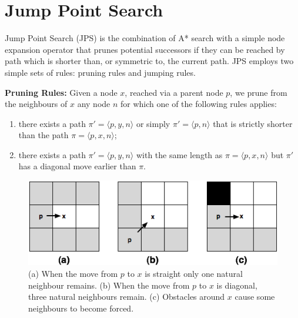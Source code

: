 \section{Jump Point Search}
\label{sec::jps}
Jump Point Search (JPS) is the combination of A* search with a simple
node expansion operator that prunes potential successors if
they can be reached by path which is shorter than, or symmetric to,
the current path. JPS employs two simple sets of rules:
pruning rules and jumping rules. 

\textbf{Pruning Rules:}
Given a node $x$, reached via a parent node $p$,
we prune from the neighbours of $x$ any node $n$ for which one 
of the following rules applies:
\begin{enumerate}
\item 
  there exists a path $\pi' = \langle p,y,n \rangle$ or simply $\pi' = \langle p, n \rangle$
  that is strictly shorter than the path $\pi = \langle p,x,n \rangle$; 
\item 
  there exists a path $\pi' = \langle p,y,n \rangle$ 
  with the same length as $\pi = \langle p,x,n \rangle$ but $\pi'$ has a 
  diagonal move earlier than $\pi$.  
\end{enumerate}

\begin{figure}[b]
       \begin{center}
		   \includegraphics[width=0.95\columnwidth]
			{diagrams/pruning.png}
       \end{center}
	\vspace{-3pt}
       \caption{(a) When the move from $p$ to $x$ is straight only one natural neighbour remains.
(b) When the move from $p$ to $x$ is diagonal, three natural neighbours remain. (c) Obstacles around $x$
cause some neighbours to become forced. }
       \label{fig:pruning}
\end{figure}

